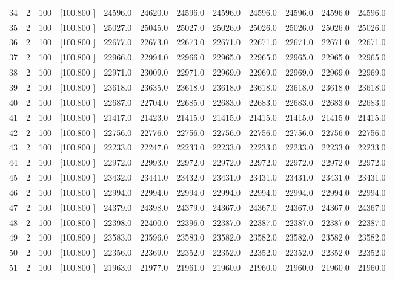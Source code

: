 \documentclass[12pt,a4paper]{article}
\begin{document}
\begin{center}
{\begin{tabular}{r r r r r r r r r r r r}
  34&  2&100&[100.800   ]& 24596.0& 24620.0& 24596.0& 24596.0& 24596.0& 24596.0& 24596.0& 24596.0\\[-0.02in]
  35&  2&100&[100.800   ]& 25027.0& 25045.0& 25027.0& 25026.0& 25026.0& 25026.0& 25026.0& 25026.0\\[-0.02in]
  36&  2&100&[100.800   ]& 22677.0& 22673.0& 22673.0& 22671.0& 22671.0& 22671.0& 22671.0& 22671.0\\[-0.02in]
  37&  2&100&[100.800   ]& 22966.0& 22994.0& 22966.0& 22965.0& 22965.0& 22965.0& 22965.0& 22965.0\\[-0.02in]
  38&  2&100&[100.800   ]& 22971.0& 23009.0& 22971.0& 22969.0& 22969.0& 22969.0& 22969.0& 22969.0\\[-0.02in]
  39&  2&100&[100.800   ]& 23618.0& 23635.0& 23618.0& 23618.0& 23618.0& 23618.0& 23618.0& 23618.0\\[-0.02in]
  40&  2&100&[100.800   ]& 22687.0& 22704.0& 22685.0& 22683.0& 22683.0& 22683.0& 22683.0& 22683.0\\[-0.02in]
  41&  2&100&[100.800   ]& 21417.0& 21423.0& 21415.0& 21415.0& 21415.0& 21415.0& 21415.0& 21415.0\\[-0.02in]
  42&  2&100&[100.800   ]& 22756.0& 22776.0& 22756.0& 22756.0& 22756.0& 22756.0& 22756.0& 22756.0\\[-0.02in]
  43&  2&100&[100.800   ]& 22233.0& 22247.0& 22233.0& 22233.0& 22233.0& 22233.0& 22233.0& 22233.0\\[-0.02in]
  44&  2&100&[100.800   ]& 22972.0& 22993.0& 22972.0& 22972.0& 22972.0& 22972.0& 22972.0& 22972.0\\[-0.02in]
  45&  2&100&[100.800   ]& 23432.0& 23441.0& 23432.0& 23431.0& 23431.0& 23431.0& 23431.0& 23431.0\\[-0.02in]
  46&  2&100&[100.800   ]& 22994.0& 22994.0& 22994.0& 22994.0& 22994.0& 22994.0& 22994.0& 22994.0\\[-0.02in]
  47&  2&100&[100.800   ]& 24379.0& 24398.0& 24379.0& 24367.0& 24367.0& 24367.0& 24367.0& 24367.0\\[-0.02in]
  48&  2&100&[100.800   ]& 22398.0& 22400.0& 22396.0& 22387.0& 22387.0& 22387.0& 22387.0& 22387.0\\[-0.02in]
  49&  2&100&[100.800   ]& 23583.0& 23596.0& 23583.0& 23582.0& 23582.0& 23582.0& 23582.0& 23582.0\\[-0.02in]
  50&  2&100&[100.800   ]& 22356.0& 22369.0& 22352.0& 22352.0& 22352.0& 22352.0& 22352.0& 22352.0\\[-0.02in]
  51&  2&100&[100.800   ]& 21963.0& 21977.0& 21961.0& 21960.0& 21960.0& 21960.0& 21960.0& 21960.0\\[-0.02in]

\end{tabular}}
\end{center}
\end{document}
